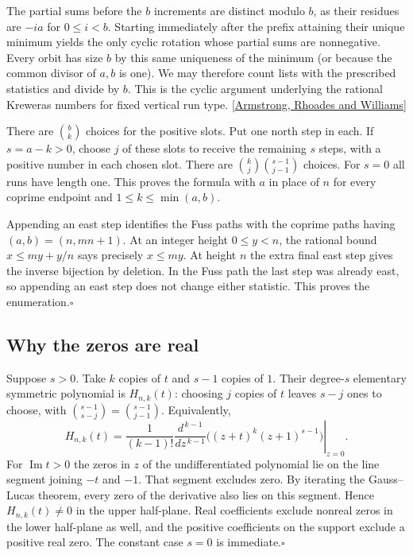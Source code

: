 \documentclass[11pt]{article}
\newcommand{\done}{\hfill\(\square\)}
\begin{document}
The partial sums before the $b$ increments are distinct modulo $b$, as their residues are $-ia$ for $0\le i<b$. Starting immediately after the prefix attaining their unique minimum yields the only cyclic rotation whose partial sums are nonnegative. Every orbit has size $b$ by this same uniqueness of the minimum (or because the common divisor of $a,b$ is one). We may therefore count lists with the prescribed statistics and divide by $b$. This is the cyclic argument underlying the rational Kreweras numbers for fixed vertical run type. [\href{https://arxiv.org/abs/1305.7286}{Armstrong, Rhoades and Williams}]

There are $\binom{b}{k}$ choices for the positive slots. Put one north step in each. If $s=a-k>0$, choose $j$ of these slots to receive the remaining $s$ steps, with a positive number in each chosen slot. There are $\binom{k}{j}\binom{s-1}{j-1}$ choices. For $s=0$ all runs have length one. This proves the formula with $a$ in place of $n$ for every coprime endpoint and $1\le k\le\min(a,b)$.

Appending an east step identifies the Fuss paths with the coprime paths having $(a,b)=(n,mn+1)$. At an integer height $0\le y<n$, the rational bound $x\le my+y/n$ says precisely $x\le my$. At height $n$ the extra final east step gives the inverse bijection by deletion. In the Fuss path the last step was already east, so appending an east step does not change either statistic. This proves the enumeration.\done

\subsection*{Why the zeros are real}
Suppose $s>0$. Take $k$ copies of $t$ and $s-1$ copies of $1$. Their degree-$s$ elementary symmetric polynomial is $H_{n,k}(t)$: choosing $j$ copies of $t$ leaves $s-j$ ones to choose, with $\binom{s-1}{s-j}=\binom{s-1}{j-1}$. Equivalently,
\[
 H_{n,k}(t)=\frac{1}{(k-1)!}
 \left.\frac{d^{\,k-1}}{dz^{\,k-1}}\big((z+t)^k(z+1)^{s-1}\big)\right|_{z=0}.
\]
For $\operatorname{Im}t>0$ the zeros in $z$ of the undifferentiated polynomial lie on the line segment joining $-t$ and $-1$. That segment excludes zero. By iterating the Gauss--Lucas theorem, every zero of the derivative also lies on this segment. Hence $H_{n,k}(t)\ne0$ in the upper half-plane. Real coefficients exclude nonreal zeros in the lower half-plane as well, and the positive coefficients on the support exclude a positive real zero. The constant case $s=0$ is immediate.\done
\end{document}
